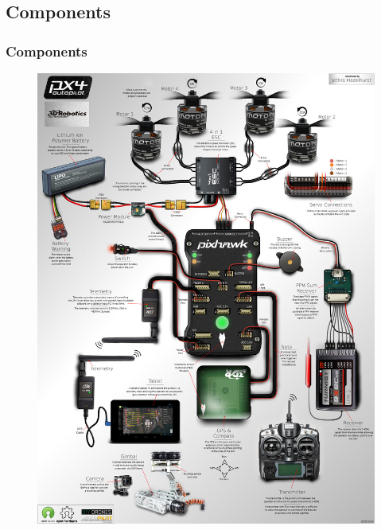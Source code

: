 \subsection*{Components}
\begin{frame}
\frametitle{Components}
\begin{figure}[H]
  \begin{center}
  \includegraphics[scale=0.12]{fig/all_devices.jpg}
  \end{center}
\end{figure}

\end{frame}
